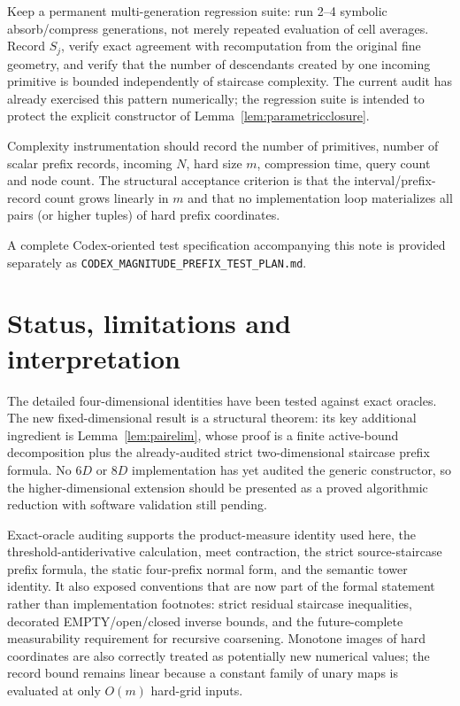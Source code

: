 \documentclass[12pt,a4paper]{article}
\theoremstyle{definition}
\newcommand{\1}{\mathbf 1}
\begin{document}
Keep a permanent multi-generation regression suite: run 2--4 symbolic absorb/compress generations, not merely repeated evaluation of cell averages.  Record $S_j$, verify exact agreement with recomputation from the original fine geometry, and verify that the number of descendants created by one incoming primitive is bounded independently of staircase complexity.  The current audit has already exercised this pattern numerically; the regression suite is intended to protect the explicit constructor of Lemma~\ref{lem:parametricclosure}.

Complexity instrumentation should record the number of primitives, number of scalar prefix records, incoming $N$, hard size $m$, compression time, query count and node count. The structural acceptance criterion is that the interval/prefix-record count grows linearly in $m$ and that no implementation loop materializes all pairs (or higher tuples) of hard prefix coordinates.

A complete Codex-oriented test specification accompanying this note is provided separately as \texttt{CODEX\_MAGNITUDE\_PREFIX\_TEST\_PLAN.md}.

\section{Status, limitations and interpretation}

The detailed four-dimensional identities have been tested against exact oracles.  The new fixed-dimensional result is a structural theorem: its key additional ingredient is Lemma~\ref{lem:pairelim}, whose proof is a finite active-bound decomposition plus the already-audited strict two-dimensional staircase prefix formula.  No $6D$ or $8D$ implementation has yet audited the generic constructor, so the higher-dimensional extension should be presented as a proved algorithmic reduction with software validation still pending.



Exact-oracle auditing supports the product-measure identity used here, the threshold-antiderivative calculation, meet contraction, the strict source-staircase prefix formula, the static four-prefix normal form, and the semantic tower identity.  It also exposed conventions that are now part of the formal statement rather than implementation footnotes: strict residual staircase inequalities, decorated EMPTY/open/closed inverse bounds, and the future-complete measurability requirement for recursive coarsening.  Monotone images of hard coordinates are also correctly treated as potentially new numerical values; the record bound remains linear because a constant family of unary maps is evaluated at only $O(m)$ hard-grid inputs.
\end{document}
